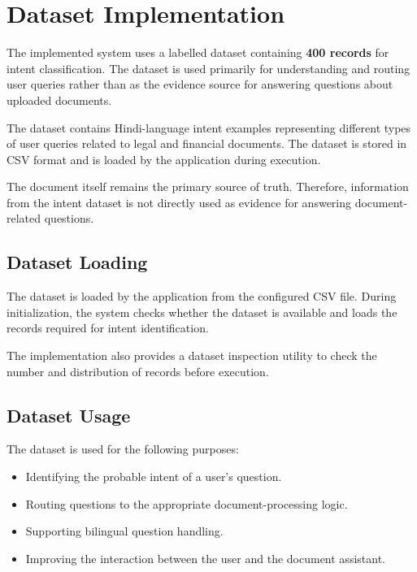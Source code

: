 \section{Dataset Implementation}

The implemented system uses a labelled dataset containing
\textbf{400 records} for intent classification. The dataset is used
primarily for understanding and routing user queries rather than as
the evidence source for answering questions about uploaded documents.

The dataset contains Hindi-language intent examples representing
different types of user queries related to legal and financial
documents. The dataset is stored in CSV format and is loaded by the
application during execution.

The document itself remains the primary source of truth. Therefore,
information from the intent dataset is not directly used as evidence
for answering document-related questions.

\subsection{Dataset Loading}

The dataset is loaded by the application from the configured CSV
file. During initialization, the system checks whether the dataset is
available and loads the records required for intent identification.

The implementation also provides a dataset inspection utility to
check the number and distribution of records before execution.

\subsection{Dataset Usage}

The dataset is used for the following purposes:

\begin{itemize}
    \item Identifying the probable intent of a user's question.
    \item Routing questions to the appropriate document-processing
    logic.
    \item Supporting bilingual question handling.
    \item Improving the interaction between the user and the document
    assistant.
\end{itemize}

